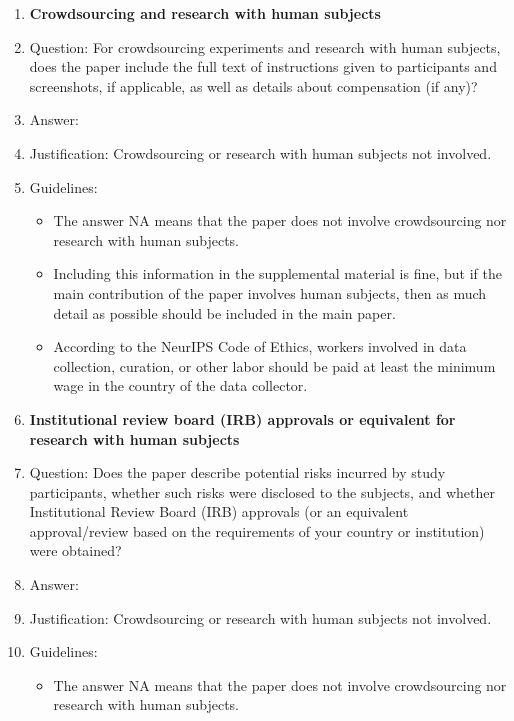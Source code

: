 \documentclass{article}
\begin{document}
\begin{enumerate}
\begin{itemize}
        \item At submission time, remember to anonymize your assets (if applicable). You can either create an anonymized URL or include an anonymized zip file.
    \end{itemize}
\item {\bf Crowdsourcing and research with human subjects}
    \item[] Question: For crowdsourcing experiments and research with human subjects, does the paper include the full text of instructions given to participants and screenshots, if applicable, as well as details about compensation (if any)?
    \item[] Answer: \answerNA{}
    \item[] Justification: Crowdsourcing or research with human subjects not involved.
    \item[] Guidelines:
    \begin{itemize}
        \item The answer NA means that the paper does not involve crowdsourcing nor research with human subjects.
        \item Including this information in the supplemental material is fine, but if the main contribution of the paper involves human subjects, then as much detail as possible should be included in the main paper.
        \item According to the NeurIPS Code of Ethics, workers involved in data collection, curation, or other labor should be paid at least the minimum wage in the country of the data collector.
    \end{itemize}
\item {\bf Institutional review board (IRB) approvals or equivalent for research with human subjects}
    \item[] Question: Does the paper describe potential risks incurred by study participants, whether such risks were disclosed to the subjects, and whether Institutional Review Board (IRB) approvals (or an equivalent approval/review based on the requirements of your country or institution) were obtained?
    \item[] Answer: \answerNA{}
    \item[] Justification: Crowdsourcing or research with human subjects not involved.
    \item[] Guidelines:
    \begin{itemize}
        \item The answer NA means that the paper does not involve crowdsourcing nor research with human subjects.

\end{itemize}
\end{enumerate}
\end{document}
